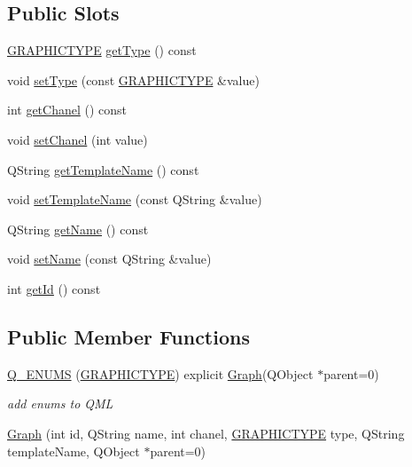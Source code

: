 \subsection*{Public Slots}
\begin{DoxyCompactItemize}
\item 
\hyperlink{class_graph_ab17f5821c439d7728a144639aa849501}{G\+R\+A\+P\+H\+I\+C\+T\+Y\+PE} \hyperlink{class_graph_a4b6573ea1f4bb9e1803378f1f7a812de}{get\+Type} () const
\item 
void \hyperlink{class_graph_af806fda6d1e73fca3ca203c90d9e8d80}{set\+Type} (const \hyperlink{class_graph_ab17f5821c439d7728a144639aa849501}{G\+R\+A\+P\+H\+I\+C\+T\+Y\+PE} \&value)
\item 
int \hyperlink{class_graph_acd7e2b641d29b3c1e4da56903614def5}{get\+Chanel} () const
\item 
void \hyperlink{class_graph_a105d0e66343efbdcf9f59b6ca71fc88c}{set\+Chanel} (int value)
\item 
Q\+String \hyperlink{class_graph_aa58147fd7b3e9c2455147dfc2d25160e}{get\+Template\+Name} () const
\item 
void \hyperlink{class_graph_a0505bdbfb8838c729cf9ee777a082f45}{set\+Template\+Name} (const Q\+String \&value)
\item 
Q\+String \hyperlink{class_graph_afbd2fdb1dba6403125c7932d7b18fa8b}{get\+Name} () const
\item 
void \hyperlink{class_graph_ac6a95e35eefe8ab6069e45b9b05ec650}{set\+Name} (const Q\+String \&value)
\item 
int \hyperlink{class_graph_a1b9029bdcb34e7dd5e8e90eb4ae26482}{get\+Id} () const
\end{DoxyCompactItemize}
\subsection*{Public Member Functions}
\begin{DoxyCompactItemize}
\item 
\hyperlink{class_graph_a80363b329e9b6c1e2cfb34f8cc4df26e}{Q\+\_\+\+E\+N\+U\+MS} (\hyperlink{class_graph_ab17f5821c439d7728a144639aa849501}{G\+R\+A\+P\+H\+I\+C\+T\+Y\+PE}) explicit \hyperlink{class_graph}{Graph}(Q\+Object $\ast$parent=0)
\begin{DoxyCompactList}\small\item\em add enums to Q\+ML \end{DoxyCompactList}\item 
\hyperlink{class_graph_a3773c87c881cc8d499c976c025eb26c9}{Graph} (int id, Q\+String name, int chanel, \hyperlink{class_graph_ab17f5821c439d7728a144639aa849501}{G\+R\+A\+P\+H\+I\+C\+T\+Y\+PE} type, Q\+String template\+Name, Q\+Object $\ast$parent=0)
\end{DoxyCompactItemize}


